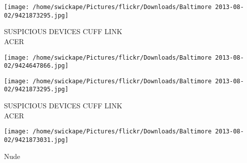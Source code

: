 \documentclass[10pt,letterpaper]{article}
\begin{document}
\vspace{0.25in}
\texttt{[image: /home/swickape/Pictures/flickr/Downloads/Baltimore 2013-08-02/9421873295.jpg]}

SUSPICIOUS DEVICES CUFF LINK\\
ACER\\
\pagebreak

\texttt{[image: /home/swickape/Pictures/flickr/Downloads/Baltimore 2013-08-02/9424647866.jpg]}

\vspace{0.25in}
\texttt{[image: /home/swickape/Pictures/flickr/Downloads/Baltimore 2013-08-02/9421873295.jpg]}

SUSPICIOUS DEVICES CUFF LINK\\
ACER\\
\pagebreak

\texttt{[image: /home/swickape/Pictures/flickr/Downloads/Baltimore 2013-08-02/9421873031.jpg]}

Nude\\
\pagebreak
\end{document}
